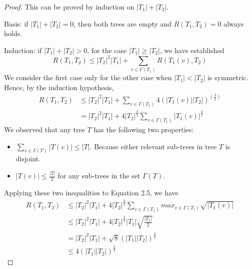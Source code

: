 \begin{proof}
This can be proved by induction on $\left\vert T_1 \right\vert + \left\vert T_2 \right\vert$.

Basis: if $\left\vert T_1 \right\vert + \left\vert T_2 \right\vert = 0$, then both trees are empty and $R(T_1, T_2) = 0$ always holds.

Induction: if $\left\vert T_1 \right\vert + \left\vert T_2 \right\vert > 0$, for the case $\left\vert T_1 \right\vert \geq \left\vert T_2 \right\vert$, we have established
\begin{equation*}
R(T_1, T_2) \leq \left\vert T_2 \right\vert^2\left\vert T_1 \right\vert + \sum_{v \in \Gamma(T_1)}R(T_1(v), T_2)
\end{equation*} 
We consider the first case only for the other case when $\left\vert T_1 \right\vert < \left\vert T_2 \right\vert$ is symmetric.
Hence, by the induction hypothesis,
\begin{align}
R(T_1, T_2) &\leq \left\vert T_2 \right\vert^2\left\vert T_1 \right\vert + \sum_{v \in \Gamma(T_1)}4(\left\vert T_1(v) \right\vert \left\vert T_2 \right\vert)^(\frac{3}{2})\\
&= \left\vert T_2 \right\vert^2 \left\vert T_1 \right\vert + 4\left\vert T_2 \right\vert^{\frac{3}{2}}\sum_{v \in \Gamma(T_1)}\left\vert T_1(v) \right\vert^{\frac{3}{2}}
\end{align}
We observed that any tree $T$ has the following two properties:
\begin{itemize}
\item $\sum_{v \in \Gamma(T)}\left\vert T(v) \right\vert \leq \left\vert T \right\vert$. Because either relevant sub-trees in tree $T$ is disjoint.
\item $\left\vert T(v) \right\vert \leq \frac{\left\vert T \right\vert}{2}$ for  any sub-trees in the set $\Gamma(T)$.
\end{itemize}
Applying these two inequalities to Equation 2.5, we have
\begin{align*}
R(T_1, T_2)
&\leq \left\vert T_2 \right\vert^2 \left\vert T_1 \right\vert + 4\left\vert T_2\right\vert^{\frac{3}{2}} \sum_{v \in \Gamma(T_1)}max_{v \in \Gamma(T_1)} \sqrt{\left\vert T_1(v) \right\vert}\\
&\leq \left\vert T_2 \right\vert^2 \left\vert T_1 \right\vert + 4\left\vert T_2 \right\vert^{\frac{3}{2}}\left\vert T_1 \right\vert \sqrt{\frac{\left\vert T_1 \right\vert}{2}}\\
&=\left\vert T_2 \right\vert^2\left\vert T_1 \right\vert + \sqrt{8}(\left\vert T_1 \right\vert \left\vert T_2 \right\vert)^{\frac{3}{2}}\\
&\leq 4(\left\vert T_1 \right\vert\left\vert T_2 \right\vert)^{\frac{3}{2}}
\end{align*}
\end{proof}

